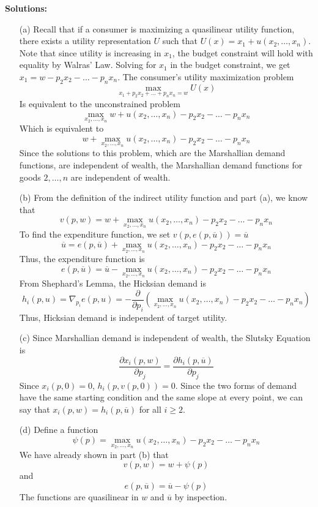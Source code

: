 \documentclass[12pt]{article}
\begin{document}
\medskip

\textbf{Solutions:}

\begin{itemize}
    \item[(a)] Recall that if a consumer is maximizing a quasilinear utility function, there exists a utility representation $U$ such that $U(x) = x_1 + u(x_2,\dots,x_n)$. Note that since utility is increasing in $x_1$, the budget constraint will hold with equality by Walras' Law. Solving for $x_1$ in the budget constraint, we get $x_1 = w - p_2x_2 - \dots - p_nx_n$. The consumer's utility maximization problem
    \[
    \max_{x_1 + p_2x_2 + \dots + p_nx_n = w} U(x)
    \]
    Is equivalent to the unconstrained problem
    \[
    \max_{x_2,\dots,x_n} w + u(x_2,\dots,x_n) - p_2x_2 - \dots - p_nx_n
    \]
    Which is equivalent to
    \[
    w + \max_{x_2,\dots,x_n} u(x_2,\dots,x_n) - p_2x_2 - \dots - p_nx_n
    \]
    Since the solutions to this problem, which are the Marshallian demand functions, are independent of wealth, the Marshallian demand functions for goods $2,\dots,n$ are independent of wealth.
    

    \item[(b)] From the definition of the indirect utility function and part (a), we know that 
    \[
    v(p,w) = w + \max_{x_2,\dots,x_n} u(x_2,\dots,x_n) - p_2x_2 - \dots - p_nx_n
    \]
    To find the expenditure function, we set $v(p,e(p,\overline{u})) = \overline{u}$
    \[
    \overline{u} = e(p,\overline{u}) + \max_{x_2,\dots,x_n} u(x_2,\dots,x_n) - p_2x_2 - \dots - p_nx_n
    \]
    Thus, the expenditure function is
    \[
    e(p,\overline{u}) = \overline{u} - \max_{x_2,\dots,x_n} u(x_2,\dots,x_n) - p_2x_2 - \dots - p_nx_n
    \]
    From Shephard's Lemma, the Hicksian demand is
    \[
    h_i(p,u) = \nabla_{p_i} e(p,u) = -\frac{\partial}{\partial p_i}\left(\max_{x_2,\dots,x_n} u(x_2,\dots,x_n) - p_2x_2 - \dots - p_nx_n\right)
    \]
    Thus, Hicksian demand is independent of target utility.

    \item[(c)] Since Marshallian demand is independent of wealth, the Slutsky Equation is
    \[
    \frac{\partial x_i(p,w)}{\partial p_j} = \frac{\partial h_i(p,\overline{u})}{\partial p_j}
    \]
    Since $x_i(p,0) = 0$, $h_i(p,v(p,0)) = 0$. Since the two forms of demand have the same starting condition and the same slope at every point, we can say that $x_i(p,w) = h_i(p,\overline{u})$ for all $i \ge 2$.

    \item[(d)] Define a function
    \[
    \psi(p) = \max_{x_2,\dots,x_n} u(x_2,\dots,x_n) - p_2x_2 - \dots - p_nx_n
    \]
    We have already shown in part (b) that
    \[
    v(p,w) = w + \psi(p)
    \]
    and
    \[
    e(p,\overline{u}) = \overline{u} - \psi(p)
    \]
    The functions are quasilinear in $w$ and $\overline{u}$ by inspection.


\end{itemize}
\end{document}

